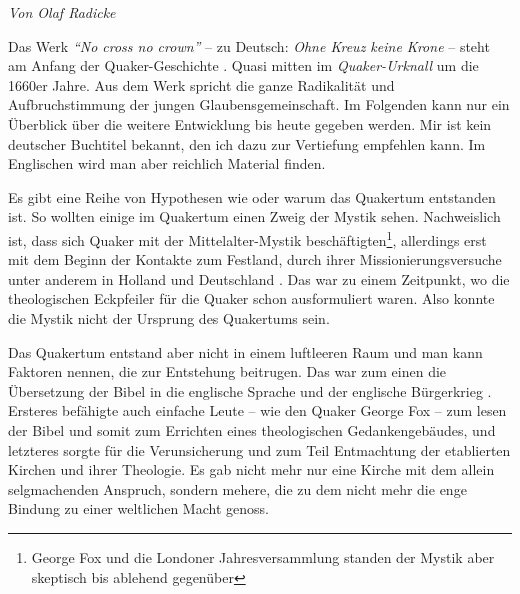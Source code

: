 


\begin{flushright}
\begin{footnotesize}
\textit{Von Olaf Radicke}
\end{footnotesize}
\end{flushright}
\smallskip

Das Werk \textit{"`No cross no crown"'} -- zu Deutsch: \textit{Ohne Kreuz keine
Krone} --
steht am Anfang der Quaker-Geschichte . Quasi mitten im
\textit{Quaker-Urknall}
um die 1660er Jahre. Aus dem Werk spricht die ganze Radikalität und
Aufbruchstimmung der jungen Glaubensgemeinschaft. Im Folgenden kann nur ein
Überblick über die weitere Entwicklung bis heute gegeben werden. Mir ist kein
deutscher Buchtitel bekannt, den ich dazu zur Vertiefung empfehlen kann. Im
Englischen wird man aber reichlich Material finden.

\medskip

Es gibt eine Reihe von Hypothesen wie oder warum das Quakertum
entstanden ist.
So
wollten einige im Quakertum einen Zweig der Mystik  sehen.
Nachweislich ist, dass
sich Quaker mit der Mittelalter-Mystik beschäftigten\footnote{George Fox und die
Londoner Jahresversammlung standen der Mystik aber skeptisch bis ablehend
gegenüber}, allerdings erst mit dem
Beginn der Kontakte zum Festland, durch ihrer Missionierungsversuche
 unter
anderem in Holland  und Deutschland
. Das war zu einem Zeitpunkt, wo die
theologischen Eckpfeiler für die Quaker schon ausformuliert waren. Also konnte
die Mystik nicht der Ursprung des Quakertums sein.

\medskip

Das Quakertum entstand aber nicht in einem luftleeren Raum und man kann Faktoren
nennen,
die zur Entstehung beitrugen. Das war zum einen die Übersetzung der Bibel
in die englische Sprache und der englische Bürgerkrieg
. Ersteres befähigte auch
einfache Leute -- wie den Quaker George Fox  -- zum
lesen der Bibel und somit zum
Errichten eines theologischen Gedankengebäudes, und letzteres sorgte für die
Verunsicherung und zum Teil Entmachtung der etablierten Kirchen
 und ihrer
Theologie. Es gab nicht mehr nur eine Kirche mit dem allein selgmachenden Anspruch, sondern mehere, die zu dem nicht mehr die enge Bindung zu einer weltlichen Macht genoss.

